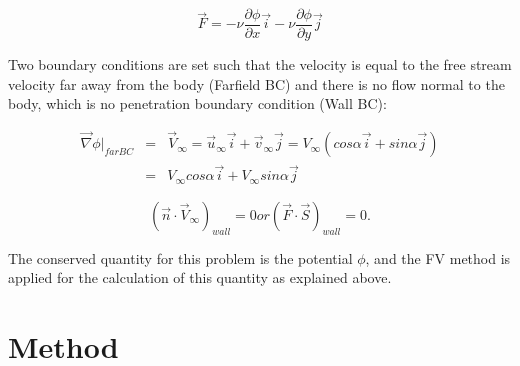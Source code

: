 \documentclass[letterpaper,12pt]{article}
\begin{document}
\begin{equation}
	\vec{F} = -\nu\frac{\partial \phi}{\partial x}\vec{i} - \nu\frac{\partial \phi}{\partial y}\vec{j}
\end{equation}

Two boundary conditions are set such that the velocity is equal to the free stream velocity
far away from the body (Farfield BC) and there is no flow normal to the body, which is no
penetration boundary condition (Wall BC):

\begin{eqnarray}
	\vec{\nabla}\phi|_{far BC} &=& \vec{V}_{\infty} = \vec{u}_{\infty}\vec{i} + \vec{v}_{\infty}\vec{j} = V_{\infty}(cos\alpha\vec{i}+sin\alpha\vec{j})\\
	&=& V_{\infty}cos\alpha\vec{i} + V_{\infty}sin\alpha\vec{j}
\end{eqnarray}

\begin{equation}
	(\vec{n}\cdot\vec{V}_{\infty})_{wall} = 0 or (\vec{F}\cdot\vec{S})_{wall} = 0.
\end{equation}

The conserved quantity for this problem is the potential $\phi$, and the FV method is applied
for the calculation of this quantity as explained above.



\section{Method}
\end{document}
